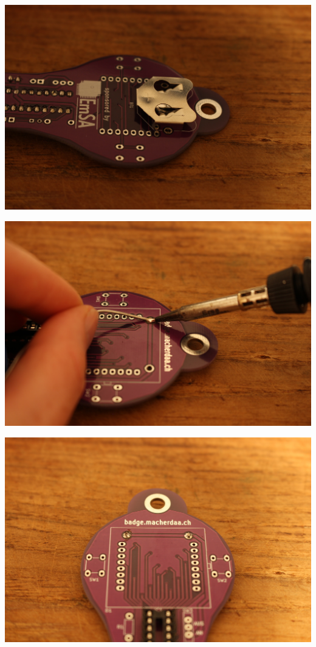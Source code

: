 \documentclass{article}
\begin{document}
\begin{minipage}[b]{0.5\textwidth}
	\includegraphics[width=\textwidth]{Bilder2024/IMG_0051.JPG}
\end{minipage}
\begin{minipage}[b]{0.5\textwidth}
	\includegraphics[width=\textwidth]{Bilder2024/IMG_0052.JPG}
\end{minipage}

\vspace{0.5cm}

\begin{minipage}[b]{0.5\textwidth}
	\includegraphics[width=\textwidth]{Bilder2024/IMG_0053.JPG}
\end{minipage}
\end{document}
